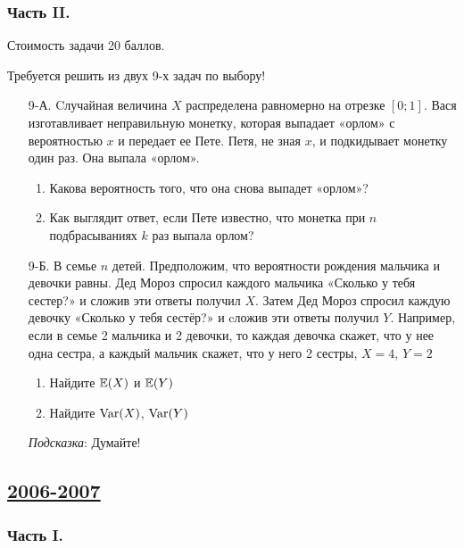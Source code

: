 \subsubsection*{Часть II.}

Стоимость задачи 20 баллов.

Требуется решить \textbf{} из двух 9-х задач по выбору!

\begin{enumerate}
\item[9-А.] Cлучайная величина $X$ распределена равномерно на отрезке $[0;1]$.
Вася изготавливает неправильную монетку, которая выпадает «орлом» с вероятностью
$x$ и передает ее Пете. Петя, не зная $x$, и подкидывает монетку один раз. Она выпала
«орлом».
\begin{enumerate}
\item Какова вероятность того, что она снова выпадет «орлом»?
\item Как выглядит ответ, если Пете известно, что монетка при $n$ подбрасываниях
$k$  раз выпала орлом?
\end{enumerate}

\item[9-Б.] В семье $n$ детей. Предположим, что вероятности рождения мальчика и
девочки равны. Дед Мороз спросил каждого мальчика «Сколько у тебя сестер?» и сложив
эти ответы получил $X$. Затем Дед Мороз спросил каждую девочку «Сколько у тебя сестёр?»
и cложив эти ответы получил $Y$. Например, если в семье 2 мальчика и 2 девочки, то
каждая девочка скажет, что у нее одна сестра, а каждый мальчик скажет, что у него 2
сестры, $X = 4$, $Y = 2$
\begin{enumerate}
\item Найдите $\operatorname{\mathbb{E}}(X)$ и $\operatorname{\mathbb{E}}(Y)$
\item Найдите $\operatorname{Var}(X)$, $\operatorname{Var}(Y)$
\end{enumerate}
\emph{Подсказка}: Думайте!
\end{enumerate}



\newpage
\subsection[2006-2007]{\hyperref[sec:sol_kr_01_2006_2007]{2006-2007}}
\label{sec:kr_01_2006_2007}

\subsubsection*{Часть I.}

